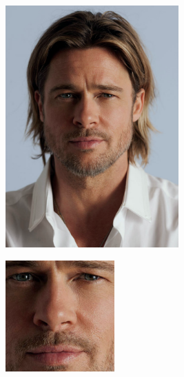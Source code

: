 \begin{figure}[H]
\begin{subfigure}{0.65\textwidth}
\begin{subfigure}{.33\textwidth}
  \centering
  \includegraphics[width=0.95\textwidth]{img/fdResult2/input12.png}
  \caption{}
\end{subfigure}%
\begin{subfigure}{.33\textwidth}
  \centering
  \includegraphics[width=0.6\textwidth]{img/fdResult2/output12.png}

\end{subfigure}
\end{subfigure}
\end{figure}
